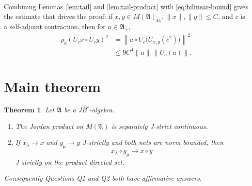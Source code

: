 \documentclass[11pt]{article}
\newtheorem{theorem}{Theorem}
\newcommand{\A}{\mathfrak A}
\newcommand{\M}{M(\mathfrak A)}
\newcommand{\sa}{\mathrm{sa}}
\begin{document}
Combining Lemmas \ref{lem:tail} and \ref{lem:tail-product} with
\eqref{eq:bilinear-bound} gives the estimate that drives the proof:
if \(x,y\in\M_\sa\), \(\lVert x\rVert,\lVert y\rVert\leq C\), and
\(c\) is a self-adjoint contraction, then for \(a\in\A_+\),
\begin{equation}\label{eq:tail-tail}
\begin{aligned}
 \rho_a(U_cx\circ U_cy)^2
 &=\left\lVert
 a\circ U_c\bigl(U_{x,y}(c^2)\bigr)\right\rVert^2\\
 &\leq9C^4\lVert a\rVert\,\lVert U_c(a)\rVert.
\end{aligned}
\end{equation}

\section*{Main theorem}

\begin{theorem}\label{thm:main}
Let \(\A\) be a JB$^*$-algebra.
\begin{enumerate}[label=(\roman*),leftmargin=*]
\item The Jordan product on \(\M\) is separately J-strict continuous.
\item If \(x_\lambda\to x\) and \(y_\mu\to y\) J-strictly and both nets are
      norm bounded, then
      \[
       x_\lambda\circ y_\mu\longrightarrow x\circ y
      \]
      J-strictly on the product directed set.
\end{enumerate}
Consequently Questions Q1 and Q2 both have affirmative answers.
\end{theorem}
\end{document}
